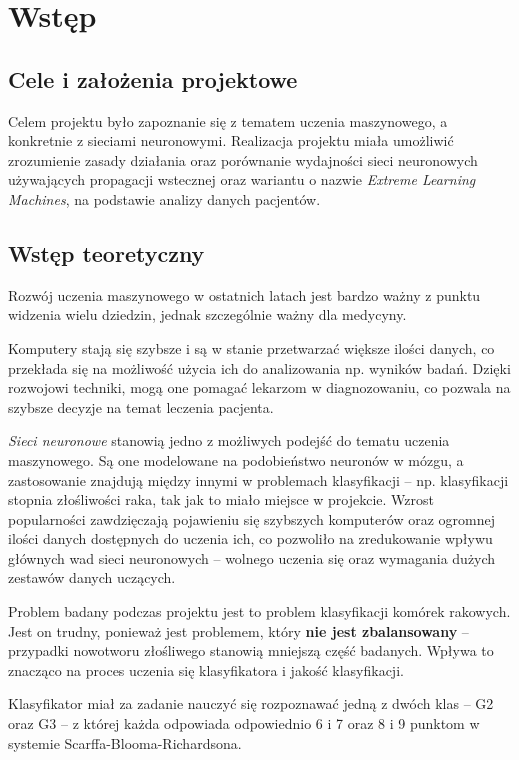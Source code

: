 \chapter{Wstęp}

\section{Cele i założenia projektowe}

Celem projektu było zapoznanie się z tematem uczenia maszynowego, a konkretnie z sieciami neuronowymi.
Realizacja projektu miała umożliwić zrozumienie zasady działania oraz porównanie wydajności sieci neuronowych używających propagacji wstecznej oraz wariantu o nazwie \textit{Extreme Learning Machines}, na podstawie analizy danych pacjentów.

\section{Wstęp teoretyczny}

Rozwój uczenia maszynowego w ostatnich latach jest bardzo ważny z punktu widzenia wielu dziedzin, jednak szczególnie ważny dla medycyny.

Komputery stają się szybsze i są w stanie przetwarzać większe ilości danych, co przekłada się na możliwość użycia ich do analizowania np. wyników badań.
Dzięki rozwojowi techniki, mogą one pomagać lekarzom w diagnozowaniu, co pozwala na szybsze decyzje na temat leczenia pacjenta.

\textit{Sieci neuronowe} stanowią jedno z możliwych podejść do tematu uczenia maszynowego.
Są one modelowane na podobieństwo neuronów w mózgu, a zastosowanie znajdują między innymi w problemach klasyfikacji -- np. klasyfikacji stopnia złośliwości raka, tak jak to miało miejsce w projekcie.
Wzrost popularności zawdzięczają pojawieniu się szybszych komputerów oraz ogromnej ilości danych dostępnych do uczenia ich, co pozwoliło na zredukowanie wpływu głównych wad sieci neuronowych -- wolnego uczenia się oraz wymagania dużych zestawów danych uczących.

Problem badany podczas projektu jest to problem klasyfikacji komórek rakowych. Jest on trudny, ponieważ jest problemem, który \textbf{nie jest zbalansowany} -- przypadki nowotworu złośliwego stanowią mniejszą część badanych. Wpływa to znacząco na proces uczenia się klasyfikatora i jakość klasyfikacji.

Klasyfikator miał za zadanie nauczyć się rozpoznawać jedną z dwóch klas -- G2 oraz G3 -- z której każda odpowiada odpowiednio 6 i 7 oraz 8 i 9 punktom w systemie Scarffa-Blooma-Richardsona.
